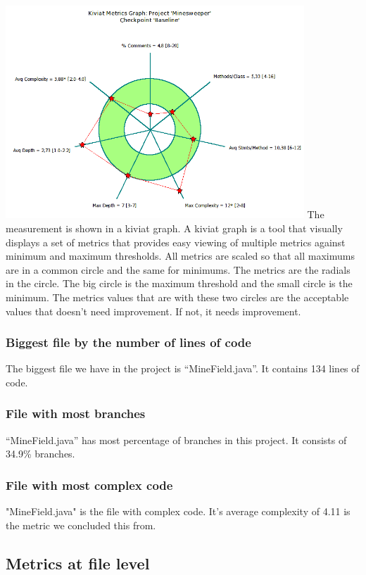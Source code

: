 \documentclass[UKenglish]{article}  %
\begin{document}
\includegraphics[height=8cm]{project-kiviat-metrics-graph-original.png}
The measurement is shown in a kiviat graph. A kiviat graph is a tool that
visually displays a set of metrics that provides easy viewing of multiple
metrics against minimum and maximum thresholds.  All metrics are scaled so
that all maximums are in a common circle and the same for minimums.
The metrics are the radials in the circle. The big circle is the maximum
threshold and the small circle is the minimum. The metrics values that are
with these two circles are the acceptable values that doesn’t need
improvement. If not, it needs improvement.

\subsubsection{Biggest file by the number of lines of code}
The biggest file we have in the project is “MineField.java”. It contains 134 lines of code.

\subsubsection{File with most branches}
“MineField.java” has most percentage of branches in this project. It consists of 34.9\% branches.

\subsubsection{File with most complex code}
"MineField.java" is the file with complex code. It's average complexity of 4.11 is the metric we concluded this from.

\subsection{Metrics at file level}
\end{document}

